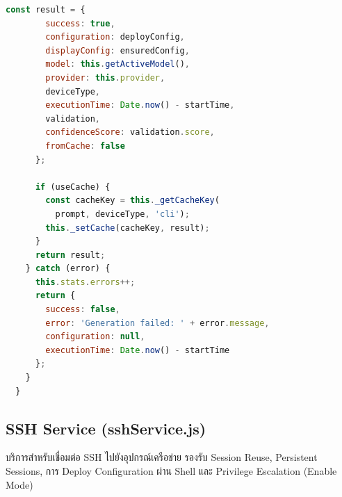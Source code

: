 \begin{lstlisting}[language=JavaScript, caption={llmService.js -- generateConfiguration}]
      const result = {
        success: true,
        configuration: deployConfig,
        displayConfig: ensuredConfig,
        model: this.getActiveModel(),
        provider: this.provider,
        deviceType,
        executionTime: Date.now() - startTime,
        validation,
        confidenceScore: validation.score,
        fromCache: false
      };

      if (useCache) {
        const cacheKey = this._getCacheKey(
          prompt, deviceType, 'cli');
        this._setCache(cacheKey, result);
      }
      return result;
    } catch (error) {
      this.stats.errors++;
      return {
        success: false,
        error: 'Generation failed: ' + error.message,
        configuration: null,
        executionTime: Date.now() - startTime
      };
    }
  }
\end{lstlisting}

\subsection{SSH Service (sshService.js)}
\hspace*{1.3em}
บริการสำหรับเชื่อมต่อ SSH ไปยังอุปกรณ์เครือข่าย รองรับ Session Reuse, Persistent Sessions, การ Deploy Configuration ผ่าน Shell และ Privilege Escalation (Enable Mode)


